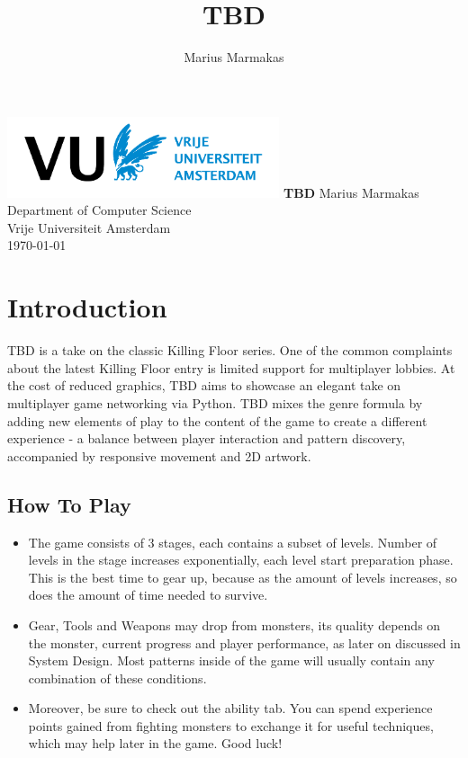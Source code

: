 \documentclass[a4paper,11pt]{article}
\newcommand{\report}{TBD}
\newcommand{\name}{Marius Marmakas}
\begin{document}
\begin{titlepage}
  \centering
    \vfill
    \includegraphics[width=8cm]{vulogo.png} %
    \vfill
    {\bfseries\Large\course\vskip2cm}
    {\bfseries\LARGE\report\vskip2cm}
    {\Large\name\vskip2cm
      Department of Computer Science\\
      Vrije Universiteit Amsterdam\\
      \vskip2cm
      \monthyeardate\today\\}  
    \vfill
\end{titlepage}
\newpage
\tableofcontents
\newpage

\title{\report}
\author{\name}
\date{}
\maketitle

\section{Introduction}
\indent TBD is a take on the classic Killing Floor series. One of the common complaints about the latest Killing Floor entry is limited support for multiplayer lobbies. At the cost of reduced graphics, TBD aims to showcase an elegant take on multiplayer game networking via Python. TBD mixes the genre formula by adding new elements of play to the content of the game to create a different experience - a balance between player interaction and pattern discovery, accompanied by responsive movement and 2D artwork.
\subsection{How To Play}
\begin{itemize}
    \item The game consists of 3 stages, each contains a subset of levels. Number of levels in the stage increases exponentially, each level start preparation phase. This is the best time to gear up, because as the amount of levels increases, so does the amount of time needed to survive.
    \item Gear, Tools and Weapons may drop from monsters, its quality depends on the monster, current progress and player performance, as later on discussed in System Design. Most patterns inside of the game will usually contain any combination of these conditions.
    \item Moreover, be sure to check out the ability tab. You can spend experience points gained from fighting monsters to exchange it for useful techniques, which may help later in the game. Good luck!
\end{itemize}
\end{document}

